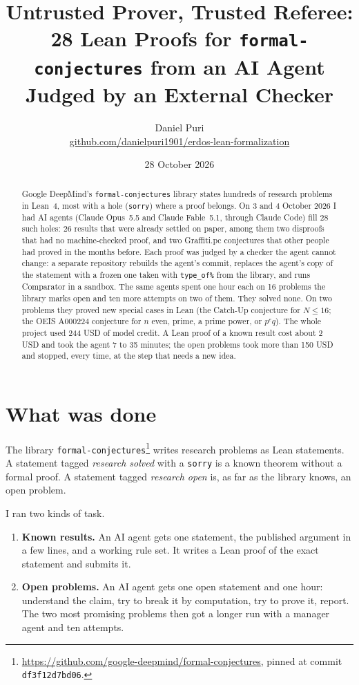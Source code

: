 \documentclass[11pt]{article}
\title{Untrusted Prover, Trusted Referee:\\ 28 Lean Proofs for \texttt{formal-conjectures} from an AI Agent Judged by an External Checker}
\author{Daniel Puri\\ \small \href{https://github.com/danielpuri1901/erdos-lean-formalization}{github.com/danielpuri1901/erdos-lean-formalization}}
\date{28 October 2026}
\begin{document}
\maketitle

\begin{abstract}
Google DeepMind's \texttt{formal-conjectures} library states hundreds of research problems in Lean~4, most with a hole (\texttt{sorry}) where a proof belongs.
On 3 and 4 October 2026 I had AI agents (Claude Opus~5.5 and Claude Fable~5.1, through Claude Code) fill 28 such holes: 26 results that were already settled on paper, among them two disproofs that had no machine-checked proof, and two Graffiti.pc conjectures that other people had proved in the months before.
Each proof was judged by a checker the agent cannot change: a separate repository rebuilds the agent's commit, replaces the agent's copy of the statement with a frozen one taken with \texttt{type\_of\%} from the library, and runs Comparator in a sandbox.
The same agents spent one hour each on 16 problems the library marks open and ten more attempts on two of them.
They solved none.
On two problems they proved new special cases in Lean (the Catch-Up conjecture for $N\le 16$; the OEIS A000224 conjecture for $n$ even, prime, a prime power, or $p^eq$).
The whole project used 244 USD of model credit.
A Lean proof of a known result cost about 2 USD and took the agent 7 to 35 minutes; the open problems took more than 150 USD and stopped, every time, at the step that needs a new idea.
\end{abstract}

\section{What was done}

The library \texttt{formal-conjectures}\footnote{\url{https://github.com/google-deepmind/formal-conjectures}, pinned at commit \texttt{df3f12d7bd06}.} writes research problems as Lean statements.
A statement tagged \emph{research solved} with a \texttt{sorry} is a known theorem without a formal proof.
A statement tagged \emph{research open} is, as far as the library knows, an open problem.

I ran two kinds of task.
\begin{enumerate}
\item \textbf{Known results.} An AI agent gets one statement, the published argument in a few lines, and a working rule set. It writes a Lean proof of the exact statement and submits it.
\item \textbf{Open problems.} An AI agent gets one open statement and one hour: understand the claim, try to break it by computation, try to prove it, report. The two most promising problems then got a longer run with a manager agent and ten attempts.
\end{enumerate}
\end{document}
